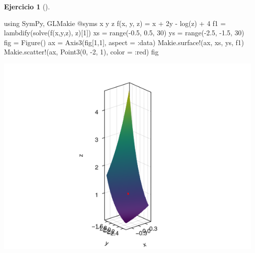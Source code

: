 \documentclass[
  a4paper,
]{scrreport}
\newenvironment{Shaded}{\begin{snugshade}}{\end{snugshade}}
\newcommand{\BuiltInTok}[1]{\textcolor[rgb]{0.00,0.23,0.31}{#1}}
\newcommand{\FloatTok}[1]{\textcolor[rgb]{0.68,0.00,0.00}{#1}}
\newcommand{\FunctionTok}[1]{\textcolor[rgb]{0.28,0.35,0.67}{#1}}
\newcommand{\ImportTok}[1]{\textcolor[rgb]{0.00,0.46,0.62}{#1}}
\newcommand{\NormalTok}[1]{\textcolor[rgb]{0.00,0.23,0.31}{#1}}
\newcommand{\OperatorTok}[1]{\textcolor[rgb]{0.37,0.37,0.37}{#1}}
\newcommand{\PreprocessorTok}[1]{\textcolor[rgb]{0.68,0.00,0.00}{#1}}
\theoremstyle{definition}
\newtheorem{exercise}{Ejercicio}[chapter]
\theoremstyle{remark}
\begin{document}
\begin{exercise}[]
\begin{tcolorbox}
\begin{Shaded}
\begin{Highlighting}[]
\ImportTok{using} \BuiltInTok{SymPy}\NormalTok{, }\BuiltInTok{GLMakie}
\PreprocessorTok{@syms}\NormalTok{ x y z}
\FunctionTok{f}\NormalTok{(x, y, z) }\OperatorTok{=}\NormalTok{ x }\OperatorTok{+} \FloatTok{2}\NormalTok{y }\OperatorTok{{-}} \FunctionTok{log}\NormalTok{(z) }\OperatorTok{+} \FloatTok{4}
\NormalTok{f1 }\OperatorTok{=} \FunctionTok{lambdify}\NormalTok{(}\FunctionTok{solve}\NormalTok{(}\FunctionTok{f}\NormalTok{(x,y,z), z)[}\FloatTok{1}\NormalTok{])}
\NormalTok{xs }\OperatorTok{=} \FunctionTok{range}\NormalTok{(}\OperatorTok{{-}}\FloatTok{0.5}\NormalTok{, }\FloatTok{0.5}\NormalTok{, }\FloatTok{30}\NormalTok{)}
\NormalTok{ys }\OperatorTok{=} \FunctionTok{range}\NormalTok{(}\OperatorTok{{-}}\FloatTok{2.5}\NormalTok{, }\OperatorTok{{-}}\FloatTok{1.5}\NormalTok{, }\FloatTok{30}\NormalTok{)}
\NormalTok{fig }\OperatorTok{=} \FunctionTok{Figure}\NormalTok{()}
\NormalTok{ax }\OperatorTok{=} \FunctionTok{Axis3}\NormalTok{(fig[}\FloatTok{1}\NormalTok{,}\FloatTok{1}\NormalTok{], aspect }\OperatorTok{=} \OperatorTok{:}\NormalTok{data)}
\NormalTok{Makie.}\FunctionTok{surface!}\NormalTok{(ax, xs, ys, f1)}
\NormalTok{Makie.}\FunctionTok{scatter!}\NormalTok{(ax, }\FunctionTok{Point3}\NormalTok{(}\FloatTok{0}\NormalTok{, }\OperatorTok{{-}}\FloatTok{2}\NormalTok{, }\FloatTok{1}\NormalTok{), color }\OperatorTok{=} \OperatorTok{:}\NormalTok{red)}
\NormalTok{fig}
\end{Highlighting}
\end{Shaded}

\includegraphics{09-derivadas-funciones-varias-variables_files/figure-pdf/cell-28-output-1.png}


\end{tcolorbox}
\end{exercise}
\end{document}
